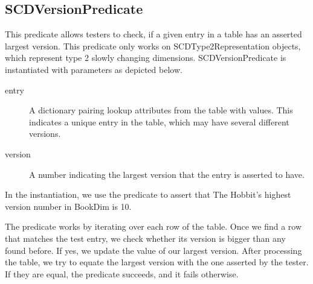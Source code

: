 \subsection{SCDVersionPredicate}\label{SCD}

This predicate allows testers to check, if a given entry in a table has an asserted largest version. This predicate only works on SCDType2Representation objects, which represent type 2 slowly changing dimensions. SCDVersionPredicate is instantiated with parameters as depicted below.


\begin{description}
\item [entry] A dictionary pairing lookup attributes from the table with values. This indicates a unique entry in the table, which may have several different versions. 
\item [version] A number indicating the largest version that the entry is asserted to have.
\end{description}

In the instantiation, we use the predicate to assert that The Hobbit's highest version number in BookDim is 10.

The predicate works by iterating over each row of the table. Once we find a row that matches the test entry, we check whether its version is bigger than any found before. If yes, we update the value of our largest version. After processing the table, we try to equate the largest version with the one asserted by the tester. If they are equal, the predicate succeeds, and it fails otherwise.   
